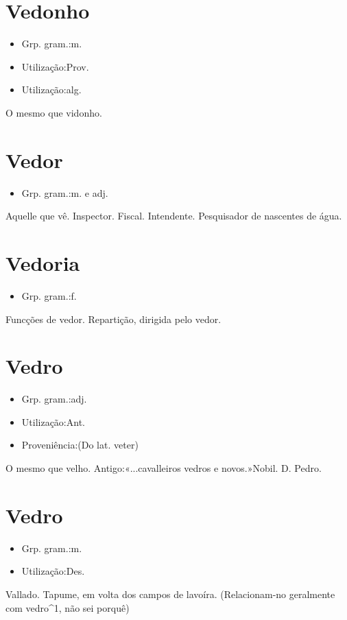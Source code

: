 \documentclass{article}
\begin{document}
\section{Vedonho}
\begin{itemize}
\item {Grp. gram.:m.}
\end{itemize}
\begin{itemize}
\item {Utilização:Prov.}
\end{itemize}
\begin{itemize}
\item {Utilização:alg.}
\end{itemize}
O mesmo que \textunderscore vidonho\textunderscore .
\section{Vedor}
\begin{itemize}
\item {Grp. gram.:m.  e  adj.}
\end{itemize}
Aquelle que vê.
Inspector.
Fiscal.
Intendente.
Pesquisador de nascentes de água.
\section{Vedoria}
\begin{itemize}
\item {Grp. gram.:f.}
\end{itemize}
Funcções de vedor.
Repartição, dirigida pelo vedor.
\section{Vedro}
\begin{itemize}
\item {Grp. gram.:adj.}
\end{itemize}
\begin{itemize}
\item {Utilização:Ant.}
\end{itemize}
\begin{itemize}
\item {Proveniência:(Do lat. \textunderscore veter\textunderscore )}
\end{itemize}
O mesmo que \textunderscore velho\textunderscore .
Antigo:«\textunderscore ...cavalleiros vedros e novos.\textunderscore »\textunderscore Nobil. D. Pedro\textunderscore .
\section{Vedro}
\begin{itemize}
\item {Grp. gram.:m.}
\end{itemize}
\begin{itemize}
\item {Utilização:Des.}
\end{itemize}
Vallado.
Tapume, em volta dos campos de lavoíra.
(Relacionam-no geralmente com \textunderscore vedro\textunderscore ^1, não sei porquê)
\end{document}
